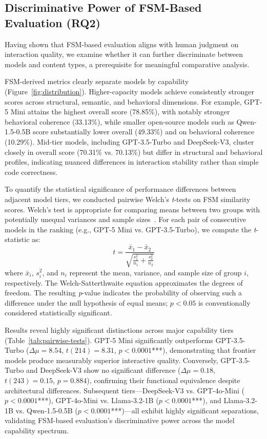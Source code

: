 \subsection{Discriminative Power of FSM-Based Evaluation (RQ2)}
Having shown that FSM-based evaluation aligns with human judgment on interaction quality, we examine whether it can further discriminate between models and content types, a prerequisite for meaningful comparative analysis.

FSM-derived metrics clearly separate models by capability (Figure~\ref{fig:distribution}). Higher-capacity models achieve consistently stronger scores across structural, semantic, and behavioral dimensions. For example, GPT-5 Mini attains the highest overall score (78.85\%), with notably stronger behavioral coherence (33.13\%), while smaller open-source models such as Qwen-1.5-0.5B score substantially lower overall (49.33\%) and on behavioral coherence (10.29\%). Mid-tier models, including GPT-3.5-Turbo and DeepSeek-V3, cluster closely in overall score (70.31\% vs. 70.13\%) but differ in structural and behavioral profiles, indicating nuanced differences in interaction stability rather than simple code correctness.

To quantify the statistical significance of performance differences between adjacent model tiers, we conducted pairwise Welch's \textit{t}-tests on FSM similarity scores. Welch's test is appropriate for comparing means between two groups with potentially unequal variances and sample sizes~\cite{welch1947}. For each pair of consecutive models in the ranking (e.g., GPT-5 Mini vs. GPT-3.5-Turbo), we compute the \textit{t}-statistic as:
\begin{equation}
t = \frac{\bar{x}_1 - \bar{x}_2}{\sqrt{\frac{s_1^2}{n_1} + \frac{s_2^2}{n_2}}}
\end{equation}
where $\bar{x}_i$, $s_i^2$, and $n_i$ represent the mean, variance, and sample size of group $i$, respectively. The Welch-Satterthwaite equation approximates the degrees of freedom. The resulting \textit{p}-value indicates the probability of observing such a difference under the null hypothesis of equal means; $p < 0.05$ is conventionally considered statistically significant.

Results reveal highly significant distinctions across major capability tiers (Table~\ref{tab:pairwise-tests}). GPT-5 Mini significantly outperforms GPT-3.5-Turbo ($\Delta\mu = 8.54$, $t(214) = 8.31$, $p < 0.0001$***), demonstrating that frontier models produce measurably superior interactive quality. Conversely, GPT-3.5-Turbo and DeepSeek-V3 show no significant difference ($\Delta\mu = 0.18$, $t(243) = 0.15$, $p = 0.884$), confirming their functional equivalence despite architectural differences. Subsequent tiers---DeepSeek-V3 vs. GPT-4o-Mini ($p < 0.0001$***), GPT-4o-Mini vs. Llama-3.2-1B ($p < 0.0001$***), and Llama-3.2-1B vs. Qwen-1.5-0.5B ($p < 0.0001$***)---all exhibit highly significant separations, validating FSM-based evaluation's discriminative power across the model capability spectrum.

